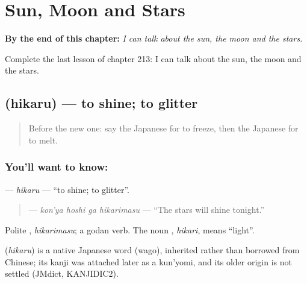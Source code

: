 
\chapter{Sun, Moon and Stars}
\label{ch:ja-sun-moon-and-stars}

\begin{chapteropening}
\textbf{By the end of this chapter:} \emph{I can talk about the sun, the moon and the stars.}

Complete the last lesson of chapter 213: I can talk about the sun, the moon and the stars.
\end{chapteropening}

\section[\texorpdfstring{\ja{ひかる} (hikaru)}{ひかる (hikaru)}]{ (hikaru) — to shine; to glitter}

\label{lesson:JA-C213-hikaru}



\begin{quote}
Before the new one: say the Japanese for to freeze, then the Japanese for to melt.
\end{quote}

\subsection*{You'll want to know: }
\textbf{} — \emph{hikaru} — \textquotedblleft{}to shine; to glitter\textquotedblright{}.

\begin{quote}
\textbf{  } — \emph{kon'ya hoshi ga hikarimasu} — \textquotedblleft{}The stars will shine tonight.\textquotedblright{}
\end{quote}

Polite \textbf{}, \emph{hikarimasu}; a godan verb. The noun \textbf{}, \emph{hikari}, means \textquotedblleft{}light\textquotedblright{}.

\begin{cousinweb}
\textbf{} (\emph{hikaru}) is a native Japanese word (wago), inherited rather than borrowed from Chinese; its kanji was attached later as a kun'yomi, and its older origin is not settled (JMdict, KANJIDIC2).
\end{cousinweb}

